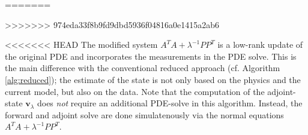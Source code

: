 \documentclass{iopart}
\begin{document}
{\begin{algorithm}
\begin{algorithmic}

=======

\vspace{1mm}
\vspace{2mm}
\vspace{1mm}
\STATE{determine steplength $\alpha^k \in (0,1]$}
\vspace{1mm}
\vspace{1mm}
\vspace{2mm}
\vspace{1mm}
>>>>>>> 974eda33f8b9fd9dbd5936f04816a0e1415a2ab6
\ENDWHILE
\end{algorithmic}
\end{algorithm}
%
<<<<<<< HEAD
The modified system $A^TA + \lambda^{-1}PP^T$ is a low-rank update of the original PDE and
incorporates the measurements in the PDE solve. This is the main difference with the conventional reduced approach (cf. Algorithm \ref{alg:reduced}); the estimate of the state is not only based on the physics and the current model, but also on the data.
Note that the computation of the adjoint-state $\mathbf{v}_{\lambda}$ does \emph{not} require an additional PDE-solve in this algorithm. Instead, the forward and adjoint solve are done simulatenously via the normal equations $A^TA + \lambda^{-1}PP^T$.

}
\end{document}
